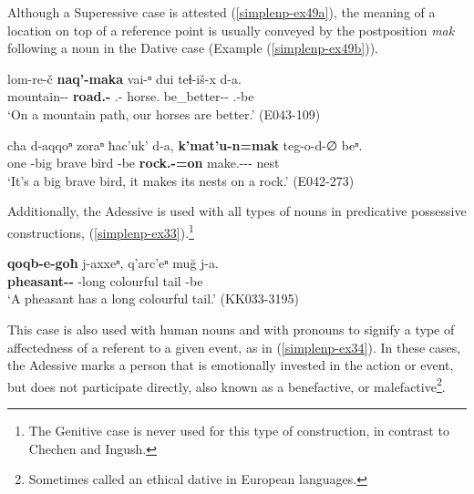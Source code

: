 Although a Superessive case is attested (\ref{simplenp-ex49a}), the meaning of a location on top of a reference point is usually conveyed by the postposition \textit{mak} following a noun in the Dative case (Example (\ref{simplenp-ex49b})).

\begin{exe}
	\ex\label{simplenp-ex49}
	\begin{xlist}
		
		\ex\label{simplenp-ex49a}
		\gll lom-re-č \textbf{naq'-maka} vai-ⁿ dui teɬ-iš-x d-a. \\
		mountain-{\Adjz}-{\Obl} \textbf{road.{\Obl}-{\Superess}} {\Fpl}.{\Incl}-{\Gen} horse.{\Pl} be\_better-{\Simul}-{\Cmp} {\B}.{\Pl}-be \\
		\trans `On a mountain path, our horses are better.'
		\hfill (E043-109)
		
		\ex\label{simplenp-ex49b}
		\gll cħa d-aqqoⁿ zoraⁿ ħac'uk' d-a, \textbf{k'mat'u-n=mak} teg-o-d-∅ beⁿ. \\
		one {\D}-big brave bird {\D}-be \textbf{rock.{\Obl}-{\Dat}=on} make.{\Ipfv}-{\Npst}-{\D}-{\Tr} nest \\
		\trans `It's a big brave bird, it makes its nests on a rock.'
		\hfill (E042-273)
		
	\end{xlist}
\end{exe}

Additionally, the Adessive is used with all types of nouns in predicative possessive constructions, (\ref{simplenp-ex33}).\footnote{The Genitive case is never used for this type of construction, in contrast to Chechen and Ingush.}



	\begin{exe}
		\ex\label{simplenp-ex33}
		\gll \textbf{qoqb-e-goħ} j-axxeⁿ, q'arc'eⁿ mu\u{g} j-a. \\
		\textbf{pheasant-{\Obl}-{\Adess}} {\J}-long colourful tail {\J}-be \\
		\trans `A pheasant has a long colourful tail.'
		\hfill (KK033-3195)
	\end{exe}


This case is also used with human nouns and with pronouns to signify a type of affectedness of a referent to a given event, as in  (\ref{simplenp-ex34}). In these cases, the Adessive marks a person that is emotionally invested in the action or event, but does not participate directly, also known as a benefactive, or malefactive\footnote{Sometimes called an ethical dative in European languages.}.

